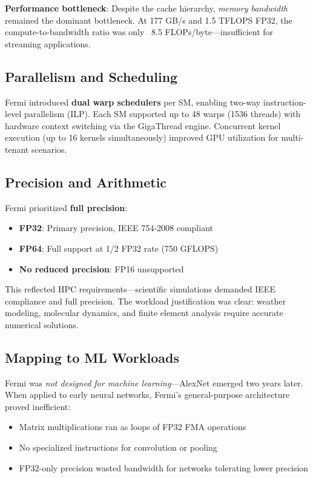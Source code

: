 \documentclass{article}
\begin{document}
\textbf{Performance bottleneck}: Despite the cache hierarchy, \textit{memory bandwidth} remained the dominant bottleneck. At 177 GB/s and 1.5 TFLOPS FP32, the compute-to-bandwidth ratio was only ~8.5 FLOPs/byte—insufficient for streaming applications.

\subsection{Parallelism and Scheduling}

Fermi introduced \textbf{dual warp schedulers} per SM, enabling two-way instruction-level parallelism (ILP). Each SM supported up to 48 warps (1536 threads) with hardware context switching via the GigaThread engine. Concurrent kernel execution (up to 16 kernels simultaneously) improved GPU utilization for multi-tenant scenarios.

\subsection{Precision and Arithmetic}

Fermi prioritized \textbf{full precision}:
\begin{itemize}
\item \textbf{FP32}: Primary precision, IEEE 754-2008 compliant
\item \textbf{FP64}: Full support at 1/2 FP32 rate (750 GFLOPS)
\item \textbf{No reduced precision}: FP16 unsupported
\end{itemize}

This reflected HPC requirements—scientific simulations demanded IEEE compliance and full precision. The workload justification was clear: weather modeling, molecular dynamics, and finite element analysis require accurate numerical solutions.

\subsection{Mapping to ML Workloads}

Fermi was \textit{not designed for machine learning}—AlexNet emerged two years later. When applied to early neural networks, Fermi's general-purpose architecture proved inefficient:
\begin{itemize}
\item Matrix multiplications ran as loops of FP32 FMA operations
\item No specialized instructions for convolution or pooling
\item FP32-only precision wasted bandwidth for networks tolerating lower precision
\end{itemize}
\end{document}
